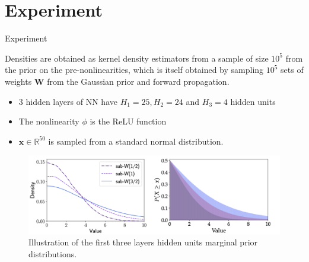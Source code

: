 \documentclass[10pt, handout, envcountsect]{beamer} %
\begin{document}
\section{Experiment}
\begin{frame}{Experiment}


Densities are obtained as kernel density estimators from a sample of size $10^5$ from the prior on the pre-nonlinearities, which is itself obtained by sampling $10^5$ sets of weights $\boldsymbol{W}$ from the Gaussian prior and forward propagation.

\vspace{3pt}

\begin{itemize}
    \item 3 hidden layers of NN have $H_1 = 25, H_2 = 24$ and $H_3 = 4$ hidden units
    \item The nonlinearity $\phi$ is the ReLU function
    \item $\boldsymbol{x} \in \mathbb{R}^{50}$ is sampled from a standard normal distribution.
\end{itemize}

\begin{figure}[h]
    \centering
    \includegraphics[width=12cm,]{figure_1.png}
    \caption{Illustration of the first three layers hidden units marginal prior distributions.}
\end{figure} 
    
\end{frame}

\end{document}
